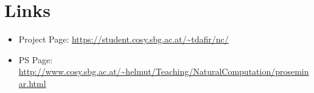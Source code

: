 \documentclass[12pt,fleqn,a4paper]{article}
\begin{document}

\section{Links}

\begin{itemize}
\item Project Page: \url{https://student.cosy.sbg.ac.at/~tdafir/nc/}
\item PS Page:
\url{http://www.cosy.sbg.ac.at/~helmut/Teaching/NaturalComputation/proseminar.html}

\end{itemize}

\nocite{*}

\end{document}
